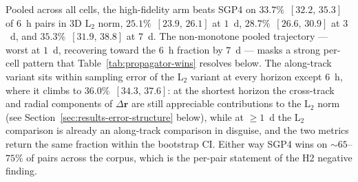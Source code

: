 \documentclass[10pt, letterpaper]{article}
\begin{document}
\begin{table}[ht]
  \centering
  \caption{Per-cell fraction of $(\mathrm{TLE}_{i},\,\mathrm{TLE}_{j})$
  pairs on which the high-fidelity propagator achieves a smaller
  position error than SGP4 against the next-TLE proxy. The 3D
  L$_{2}$ column reads ``$\lVert\Delta\mathbf{r}_{\mathrm{hifi}}\rVert
  < \lVert\Delta\mathbf{r}_{\mathrm{SGP4}}\rVert$'' (the metric
  underlying Figure~\ref{fig:propagator-scatter}); the along-track
  column reads
  ``$\lvert\Delta r_{\mathrm{along},\,\mathrm{hifi}}\rvert <
  \lvert\Delta r_{\mathrm{along},\,\mathrm{SGP4}}\rvert$'' on the
  RSW component of Figure~\ref{fig:error-decomposition}. Both
  fractions carry $95\%$ satellite-level percentile bootstrap CIs
  ($1{,}000$ resamples drawing satellites with replacement and pooling
  all of each drawn satellite's pairs in the cell; identical
  resampling structure to Table~\ref{tab:powerlaw}). Per-cell rows
  with fewer than $30$ pairs are suppressed; pooled-per-$\Delta t$
  rows aggregate across all shells and generations. The
  cohort-resolved decomposition of these rows (per-$(\text{shell}
  \times \Delta t \times \text{generation})$ win fractions) is in
  Table~\ref{tab:propagator-wins-by-gen} alongside the
  Section~\ref{sec:discussion-v2mini} cohort-mechanism discussion.}
  \label{tab:propagator-wins}
  
\end{table}

Pooled across all cells, the high-fidelity arm beats SGP4 on
$33.7\%$~$[32.2,\,35.3]$ of $6$~h pairs in 3D L$_{2}$ norm,
$25.1\%$~$[23.9,\,26.1]$ at $1$~d, $28.7\%$~$[26.6,\,30.9]$ at
$3$~d, and $35.3\%$~$[31.9,\,38.8]$ at $7$~d. The non-monotone
pooled trajectory --- worst at $1$~d, recovering toward the $6$~h
fraction by $7$~d --- masks a strong per-cell pattern that
Table~\ref{tab:propagator-wins} resolves below. The along-track
variant sits within sampling error of the L$_{2}$ variant at every
horizon except $6$~h, where it climbs to $36.0\%$~$[34.3,\,37.6]$:
at the shortest horizon the cross-track and radial components of
$\Delta\mathbf{r}$ are still appreciable contributions to the
L$_{2}$ norm (see Section~\ref{sec:results-error-structure} below),
while at $\geq 1$~d the L$_{2}$ comparison is already an
along-track comparison in disguise, and the two metrics return the
same fraction within the bootstrap CI. Either way SGP4 wins on
$\sim\!65$--$75\%$ of pairs across the corpus, which is the
per-pair statement of the H2 negative finding.
\end{document}
